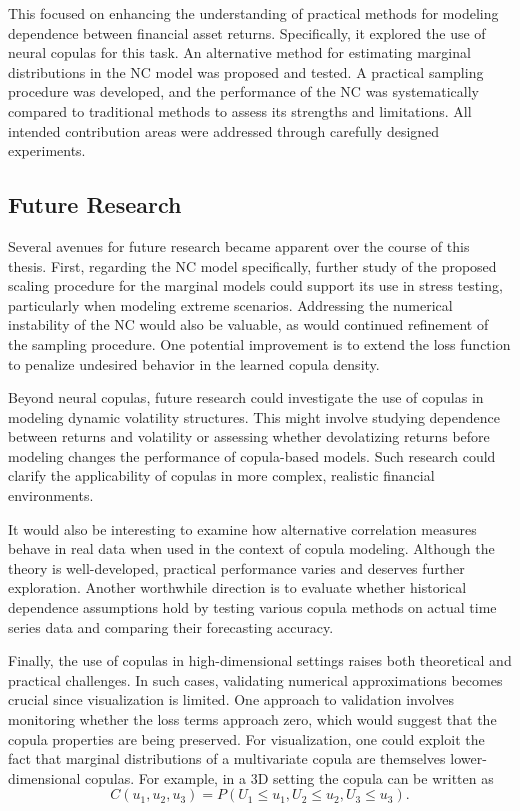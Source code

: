 This focused on enhancing the understanding of practical methods for modeling dependence between financial asset returns. Specifically, it explored the use of neural copulas for this task. An alternative method for estimating marginal distributions in the \gls{NC} model was proposed and tested. A practical sampling procedure was developed, and the performance of the \gls{NC} was systematically compared to traditional methods to assess its strengths and limitations. All intended contribution areas were addressed through carefully designed experiments.


\subsection{Future Research}\label{sec:future}
Several avenues for future research became apparent over the course of this thesis. First, regarding the \gls{NC} model specifically, further study of the proposed scaling procedure for the marginal models could support its use in stress testing, particularly when modeling extreme scenarios. Addressing the numerical instability of the \gls{NC} would also be valuable, as would continued refinement of the sampling procedure. One potential improvement is to extend the loss function to penalize undesired behavior in the learned copula density.

Beyond neural copulas, future research could investigate the use of copulas in modeling dynamic volatility structures. This might involve studying dependence between returns and volatility or assessing whether devolatizing returns before modeling changes the performance of copula-based models. Such research could clarify the applicability of copulas in more complex, realistic financial environments.

It would also be interesting to examine how alternative correlation measures behave in real data when used in the context of copula modeling. Although the theory is well-developed, practical performance varies and deserves further exploration. Another worthwhile direction is to evaluate whether historical dependence assumptions hold by testing various copula methods on actual time series data and comparing their forecasting accuracy.

Finally, the use of copulas in high-dimensional settings raises both theoretical and practical challenges. In such cases, validating numerical approximations becomes crucial since visualization is limited. One approach to validation involves monitoring whether the loss terms approach zero, which would suggest that the copula properties are being preserved. For visualization, one could exploit the fact that marginal distributions of a multivariate copula are themselves lower-dimensional copulas. For example, in a 3D setting the copula can be written as 
\[
    C(u_1, u_2, u_3) = P(U_1 \leq u_1, U_2 \leq u_2, U_3 \leq u_3).
\]

